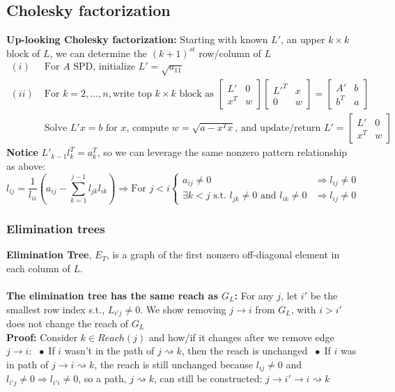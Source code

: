 \documentclass{article}
\newcommand*\bspace{$\; \bullet \;$}
\begin{document}
\subsection{Cholesky factorization}
\textbf{Up-looking Cholesky factorization:} Starting with known $L'$, an upper $k \times k$ block of $L$, we can determine the $(k+1)^{st}$ row/column of $L$
\begin{align*}
    (i) \;& \textrm{For $A$ SPD, initialize } L' = \sqrt{a_{11}}\\
    (ii) \;& \textrm{For } k=2, \dots, n, \textrm{write top $k\times k$ block as } \begin{bmatrix} L' & 0\\x^T & w \end{bmatrix} \begin{bmatrix} L'^T & x\\0 & w \end{bmatrix} = \begin{bmatrix} A' & b\\b^T & a \end{bmatrix}\\
    &\textrm{Solve } L'x=b \textrm{ for $x$, compute } w = \sqrt{a-x^Tx} \textrm{, and update/return } L' = \begin{bmatrix} L' & 0\\x^T & w \end{bmatrix}
\end{align*}
\textbf{Notice } $L'_{k-1}l_k^T = a_k^T$, so we can leverage the same nonzero pattern relationship as above:
\begin{equation*}
    l_{ij} = \frac{1}{l_{ii}}\left(a_{ij} - \sum_{k=1}^{j-1}l_{jk}l_{ik}\right) \Longrightarrow \textrm{For } j < i
    \begin{cases}
        a_{ij} \neq 0 & \Rightarrow l_{ij} \neq 0\\
        \exists k<j \textrm{ s.t. } l_{jk} \neq 0 \textrm{ and } l_{ik} \neq 0 & \Rightarrow l_{ij} \neq 0
    \end{cases}
\end{equation*}

\subsubsection{Elimination trees}
\textbf{Elimination Tree}, $E_T$, is a graph of the first nonzero off-diagonal element in each column of $L$.\\\\
\textbf{The elimination tree has the same reach as $G_L$:}  For any $j$, let $i'$ be the smallest row index s.t., $L_{i'j}  \neq 0$. We show removing $j\rightarrow i$ from $G_L$, with $i > i'$ does not change the reach of $G_L$\\
\textbf{Proof:} Consider $k \in Reach(j)$ and how/if it changes after we remove edge $j \rightarrow i$: \bspace If $i$ wasn't in the path of $j \rightsquigarrow k$, then the reach is unchanged \bspace If $i$ was in path of $j \rightarrow i \rightsquigarrow k$, the reach is still unchanged because $l_{ij}\neq 0$ and $l_{i'j} \neq 0 \Longrightarrow l_{i'i} \neq 0$, so a path, $j \rightsquigarrow k$, can still be constructed: $j \rightarrow i' \rightarrow i \rightsquigarrow k$
\end{document}
